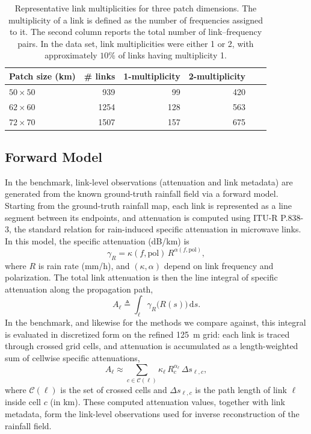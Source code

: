 \documentclass[11pt]{article}
\begin{document}

\begin{table}[H]
  \centering
  \begin{tabular}{lrrrrr}
    \toprule
    Patch size (km) & \# links & 1-multiplicity & 2-multiplicity \\
    \midrule
    $50 \times 50$ & 939 & 99 & 420 \\
    $62 \times 60$ & 1254 & 128 & 563  \\
    $72 \times 70$ & 1507 & 157 & 675  \\
    \bottomrule
  \end{tabular}
  \caption{Representative link multiplicities for three patch dimensions.
The multiplicity of a link is defined as the number of frequencies assigned to it.
The second column reports the total number of link–frequency pairs.
In the data set, link multiplicities were either 1 or 2, with approximately $10\%$ of links having multiplicity 1.
}

\end{table}


\subsection{Forward Model}
In the benchmark, link-level observations (attenuation and link metadata) are generated from the known ground-truth rainfall field via a forward model. Starting from the ground-truth rainfall map, each link is represented as a line segment between its endpoints, and attenuation is computed using ITU-R P.838-3, the standard relation for rain-induced specific attenuation in microwave links. In this model, the specific attenuation (dB/km) is
\[
\gamma_R = \kappa(f,\mathrm{pol})\,R^{\alpha(f,\mathrm{pol})},
\]
where $R$ is rain rate (mm/h), and $(\kappa,\alpha)$ depend on link frequency and polarization. The total link attenuation is then the line integral of specific attenuation along the propagation path,
\[
A_\ell \triangleq \int_{\ell} \gamma_R\bigl(R(s)\bigr)\,\mathrm{d}s.
\]
In the benchmark, and likewise for the methods we compare against, this integral is evaluated in discretized form on the refined \SI{125}{m} grid: each link is traced through crossed grid cells, and attenuation is accumulated as a length-weighted sum of cellwise specific attenuations,
\[
A_\ell \approx \sum_{c\in\mathcal{C}(\ell)} \kappa_\ell\,R_c^{\alpha_\ell}\,\Delta s_{\ell,c},
\]
where $\mathcal{C}(\ell)$ is the set of crossed cells and $\Delta s_{\ell,c}$ is the path length of link $\ell$ inside cell $c$ (in km). These computed attenuation values, together with link metadata, form the link-level observations used for inverse reconstruction of the rainfall field.
\end{document}
